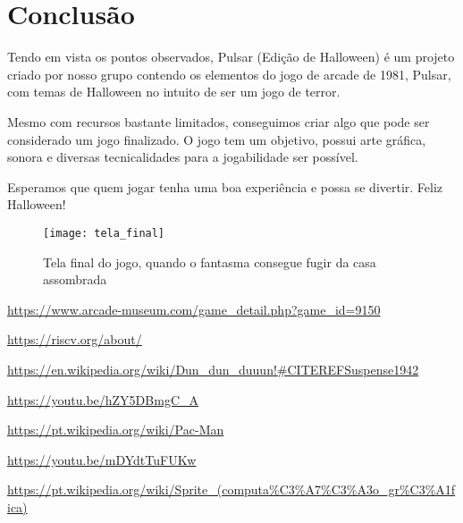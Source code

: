 \documentclass[conference]{IEEEtran}
\begin{document}
\section*{Conclusão}

Tendo em vista os pontos observados, Pulsar (Edição de Halloween) é um projeto criado por nosso grupo contendo os elementos do jogo de arcade de 1981, Pulsar, com temas de Halloween no intuito de ser um jogo de terror.

Mesmo com recursos bastante limitados, conseguimos criar algo que pode ser considerado um jogo finalizado. O jogo tem um objetivo, possui arte gráfica, sonora e diversas tecnicalidades para a jogabilidade ser possível. 

Esperamos que quem jogar tenha uma boa experiência e possa se divertir. Feliz Halloween!  

\begin{figure}[h]
\centering
\texttt{[image: tela\_final]}
\caption{Tela final do jogo, quando o fantasma consegue fugir da casa assombrada}
\end{figure}  

\begin{thebibliography}{00}
 \url{https://www.arcade-museum.com/game_detail.php?game_id=9150} 

 \url{https://riscv.org/about/}

 \url{https://en.wikipedia.org/wiki/Dun_dun_duuun!\#CITEREFSuspense1942}

 \url{https://youtu.be/hZY5DBmgC_A}

 \url{https://pt.wikipedia.org/wiki/Pac-Man}

 \url{https://youtu.be/mDYdtTuFUKw}

 \url{https://pt.wikipedia.org/wiki/Sprite_(computa%C3%A7%C3%A3o_gr%C3%A1fica)}

\end{thebibliography}
\vspace{12pt}
\end{document}
